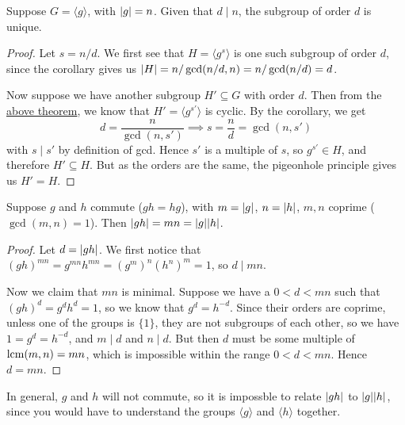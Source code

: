 \begin{theorem}\label{thm:cyclic-subgroup-uniqueness}
    Suppose \(G = \langle g \rangle\), with \(\abs{g} = n\).
    Given that \(d \mid n\), the subgroup of order \(d\) is unique.
\end{theorem}
\begin{proof}
    Let \(s = n/d\).
    We first see that \(H = \langle g^s \rangle\)
    is one such subgroup of order \(d\),
    since the corollary gives us
    \(\abs{H} = n/\gcd(n/d,n) = n/\gcd(n/d) = d\).

    Now suppose we have another subgroup \(H' \subseteq G\)
    with order \(d\).
    Then from the \hyperref[thm:cyclic-subgroup]{above theorem},
    we know that \(H' = \langle g^{s'} \rangle\) is cyclic.
    By the corollary, we get
    \begin{equation*}
        d = \frac{n}{\gcd(n,s')} \implies s = \frac{n}{d} = \gcd(n,s')
    \end{equation*}
    with \(s \mid s'\) by definition of gcd.
    Hence \(s'\) is a multiple of \(s\),
    so \(g^{s'} \in H\), and therefore \(H' \subseteq H\).
    But as the orders are the same,
    the pigeonhole principle gives us \(H' = H\).
\end{proof}

\begin{theorem}
    Suppose \(g\) and \(h\) commute (\(gh = hg\)),
    with \(m = \abs{g}\), \(n = \abs{h}\),
    \(m,n\) coprime (\(\gcd(m,n) = 1\)).
    Then \(\abs{gh} = mn = \abs{g}\abs{h}\).
\end{theorem}
\begin{proof}
    Let \(d = \abs{gh}\).
    We first notice that
    \({(gh)}^{mn} = g^{mn}h^{mn} = {(g^m)}^n{(h^n)}^m = 1\),
    so \(d \mid mn\).

    Now we claim that \(mn\) is minimal.
    Suppose we have a \(0 < d < mn\) such that \({(gh)}^d = g^d h^d = 1\),
    so we know that \(g^d = h^{-d}\).
    Since their orders are coprime,
    unless one of the groups is \(\{1\}\),
    they are not subgroups of each other,
    so we have \(1 = g^d = h^{-d}\),
    and \(m \mid d\) and \(n \mid d\).
    But then \(d\) must be some multiple of \(\operatorname{lcm}(m,n) = mn\),
    which is impossible within the range \(0 < d < mn\).
    Hence \(d = mn\).
\end{proof}
\begin{remark}
    In general, \(g\) and \(h\) will not commute,
    so it is impossble to relate \(\abs{gh}\) to \(\abs{g}\abs{h}\),
    since you would have to understand the groups
    \(\langle g \rangle\) and \(\langle h \rangle\) together.
\end{remark}


